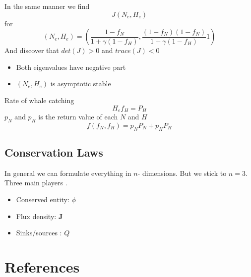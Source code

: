 \documentclass{article}
\theoremstyle{remark}
\begin{document}
  In the same manner we find \[
  J\left( N_{e}, H_{e} \right) 
  \] 
  for \[
  \left( N_{e} , H_{e} \right) = \left( \frac{1-f_{N}}{ 1 + \gamma  \left( 1 - f_{H} \right)}, \frac{\left( 1 - f_{N} \right) \left( 1 - f_{N} \right)}{ 1 + \gamma \left( 1 - f_{H} \right) } 1  \right)
  \] 
  And discover that $det\left( J \right) > 0$ and $trace\left( J \right) < 0$ 
\begin{itemize}
  \item Both eigenvalues have negative part
  \item  $\left( N_{e}, H_{e} \right)$ is asymptotic stable
\end{itemize}
Rate of whale catching \[
H_{e}f_{H} = P_{H}
\] 
$p_{N} $ and $p_{H}$ is the return value of each $N$ and $H$ \[
f\left( f_{N} , f_{H}  \right) = p_{N} P_{N} + p_{H}  P_{H}
\] 
  
\subsection{Conservation Laws}%
\label{sub:conservation_laws}

In general we can formulate everything in $n$- dimensions. But we stick to $n = 3 $.  Three main players .
 \begin{itemize}
  \item Conserved entity: $\phi $
  \item  Flux density: $\mathbf{J}$
  \item Sinks/sources : $Q$
\end{itemize}
  
  

  
  




\section{References}%
\label{sec:references}


  


\end{document}
